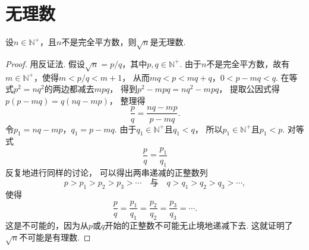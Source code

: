 \section{无理数}
\begin{proposition}
设\(n\in\mathbb{N}^+\)，且\(n\)不是完全平方数，则\(\sqrt{n}\)是无理数.
\begin{proof}
用反证法.
假设\(\sqrt{n} = p/q\)，其中\(p,q\in\mathbb{N}^+\).
由于\(n\)不是完全平方数，故有\(m\in\mathbb{N}^+\)，使得\(m<p/q<m+1\)，
从而\(mq<p<mq+q\)，\(0<p-mq<q\).
在等式\(p^2=nq^2\)的两边都减去\(mpq\)，
得到\(p^2-mpq=nq^2-mpq\)，
提取公因式得\(p(p-mq)=q(nq-mp)\)，
整理得\begin{equation*}
	\frac{p}{q} = \frac{nq-mp}{p-mq}.
\end{equation*}
令\(p_1=nq-mp\)，\(q_1=p-mq\).
由于\(q_1\in\mathbb{N}^+\)且\(q_1<q\)，
所以\(p_1\in\mathbb{N}^+\)且\(p_1<p\).
对等式\begin{equation*}
	\frac{p}{q} = \frac{p_1}{q_1}
\end{equation*}反复地进行同样的讨论，
可以得出两串递减的正整数列\begin{equation*}
	p>p_1>p_2>p_3>\dotsb
	\quad\text{与}\quad
	q>q_1>q_2>q_3>\dotsb,
\end{equation*}
使得\begin{equation*}
	\frac{p}{q}=\frac{p_1}{q_1}=\frac{p_2}{q_2}=\frac{p_3}{q_3}=\dotsb.
\end{equation*}
这是不可能的，因为从\(p\)或\(q\)开始的正整数不可能无止境地递减下去.
这就证明了\(\sqrt{n}\)不可能是有理数.
\end{proof}
\end{proposition}
\endgroup
